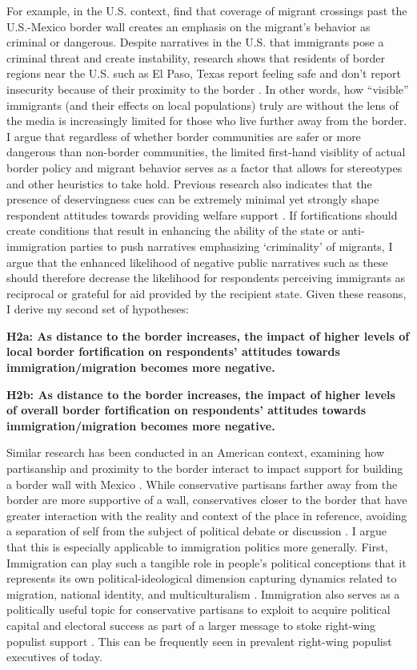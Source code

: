 \documentclass[12pt,]{article}
\begin{document}
For example, in the U.S. context, \citet{jaramillo-dent2021} find that
coverage of migrant crossings past the U.S.-Mexico border wall creates
an emphasis on the migrant's behavior as criminal or dangerous. Despite
narratives in the U.S. that immigrants pose a criminal threat and create
instability, research shows that residents of border regions near the
U.S. such as El Paso, Texas report feeling safe and don't report
insecurity because of their proximity to the border
\citep{castaneda2020}. In other words, how ``visible'' immigrants (and
their effects on local populations) truly are without the lens of the
media is increasingly limited for those who live further away from the
border. I argue that regardless of whether border communities are safer
or more dangerous than non-border communities, the limited first-hand
visiblity of actual border policy and migrant behavior serves as a
factor that allows for stereotypes and other heuristics to take hold.
Previous research also indicates that the presence of deservingness cues
can be extremely minimal yet strongly shape respondent attitudes towards
providing welfare support \citep{aaroe2014}. If fortifications should
create conditions that result in enhancing the ability of the state or
anti-immigration parties to push narratives emphasizing `criminality' of
migrants, I argue that the enhanced likelihood of negative public
narratives such as these should therefore decrease the likelihood for
respondents perceiving immigrants as reciprocal or grateful for aid
provided by the recipient state. Given these reasons, I derive my second
set of hypotheses:

\textbf{H2a: As distance to the border increases, the impact of higher
levels of local border fortification on respondents' attitudes towards
immigration/migration becomes more negative.}

\textbf{H2b: As distance to the border increases, the impact of higher
levels of overall border fortification on respondents' attitudes towards
immigration/migration becomes more negative.}

Similar research has been conducted in an American context, examining
how partisanship and proximity to the border interact to impact support
for building a border wall with Mexico \citep{cortina2020}. While
conservative partisans farther away from the border are more supportive
of a wall, conservatives closer to the border that have greater
interaction with the reality and context of the place in reference,
avoiding a separation of self from the subject of political debate or
discussion \citep{cortina2020}. I argue that this is especially
applicable to immigration politics more generally. First, Immigration
can play such a tangible role in people's political conceptions that it
represents its own political-ideological dimension capturing dynamics
related to migration, national identity, and multiculturalism
\citep{ogrady2019}. Immigration also serves as a politically useful
topic for conservative partisans to exploit to acquire political capital
and electoral success as part of a larger message to stoke right-wing
populist support \citep{dipiazza2023, kamenova2017}. This can be
frequently seen in prevalent right-wing populist executives of today.
\end{document}
